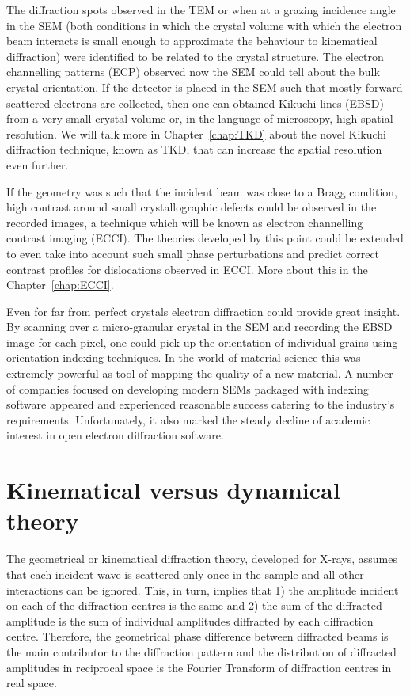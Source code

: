 The diffraction spots observed in the TEM or when at a grazing incidence angle in the SEM (both conditions in which the crystal volume with which the electron beam interacts is small enough to approximate the behaviour to kinematical diffraction) were identified to be related to the crystal structure. The electron channelling patterns (ECP) observed now the SEM could tell about the bulk crystal orientation. If the detector is placed in the SEM such that mostly forward scattered electrons are collected, then one can obtained Kikuchi lines (EBSD) from a very small crystal volume or, in the language of microscopy, high spatial resolution. We will talk more in Chapter~\ref{chap:TKD} about the novel Kikuchi diffraction technique, known as TKD, that can increase the spatial resolution even further.


If the geometry was such that the incident beam was close to a Bragg condition, high contrast around small crystallographic defects could be observed in the recorded images, a technique which will be known as electron channelling contrast imaging (ECCI). The theories developed by this point could be extended to even take into account such small phase perturbations and predict correct contrast profiles for dislocations observed in ECCI. More about this in the Chapter~\ref{chap:ECCI}. 

Even for far from perfect crystals electron diffraction could provide great insight. By scanning over a micro-granular crystal in the SEM and recording the EBSD image for each pixel, one could pick up the orientation of individual grains using orientation indexing techniques. In the world of material science this was extremely powerful as tool of mapping the quality of a new material. A number of companies focused on developing modern SEMs packaged with indexing software appeared and experienced reasonable success catering to the industry's requirements. Unfortunately, it also marked the steady decline of academic interest in open electron diffraction software.



\section{Kinematical versus dynamical theory}
\label{sec:kinvsDyn}
The geometrical or kinematical diffraction theory, developed for X-rays, assumes that each incident wave is scattered only once in the sample and all other interactions can be ignored. This, in turn, implies that  1) the amplitude incident on each of the diffraction centres is the same and 2) the sum of the diffracted amplitude is the sum of individual amplitudes diffracted by each diffraction centre. Therefore, the geometrical phase difference between diffracted beams is the main contributor to the diffraction pattern and the distribution of diffracted amplitudes in reciprocal space is the Fourier Transform of diffraction centres in real space.  

